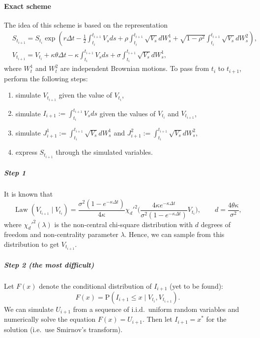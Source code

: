 \documentclass[a4paper,11pt,titlepage]{article}
\renewcommand{\P}{\mathrm{P}}
\DeclareMathOperator{\Law}{Law}
\theoremstyle{remark}
\begin{document}
\paragraph{Exact scheme \citep{BroadieKaya06}} 
The idea of this scheme is based on the representation
\begin{align}
\label{broadie-kaya-1}
&S_{t_{i+1}} = 
  S_{t_i} 
  \exp\left( 
    r\Delta t - \frac12 \int_{t_i}^{t_{i+1}} V_s  ds 
    + \rho\int_{t_i}^{t_{i+1}} \sqrt{V_s} d W_s^1 
    + \sqrt{1-\rho^2} \int_{t_i}^{t_{i+1}} \sqrt{V_s} d W_s^2
  \right),\\
\label{broadie-kaya-2}
&V_{t_{i+1}} = V_{t_i} + \kappa\theta\Delta t 
  - \kappa\int_{t_i}^{t_{i+1}} V_s ds 
  + \sigma \int_{t_i}^{t_{i+1}} \sqrt{V_s} d W_s^1,
\end{align}
where $W^1_t$ and $W_t^2$ are independent Brownian motions. To pass from $t_i$
to $t_{i+1}$, perform the following steps:
\begin{enumerate}
\item simulate $V_{t_{i+1}}$ given the value of $V_{t_i}$,
\item simulate $I_{i+1} := \int_{t_i}^{t_{i+1}} V_s ds$ given the values of
  $V_{t_i}$ and $V_{t_{i+1}}$,
\item simulate $J^1_{i+1} := \int_{t_i}^{t_{i+1}} \sqrt{V_s} d W_s^1$ and 
  $J^2_{i+1} := \int_{t_i}^{t_{i+1}} \sqrt{V_s} d W_s^2$,
\item express $S_{t_{i+1}}$ through the simulated variables.
\end{enumerate}

\subparagraph{Step 1} It is known that
\[
\Law(V_{t_{i+1}} \mid V_{t_i}) = 
  \frac{\sigma^2(1 - e^{-\kappa\Delta t})}{4\kappa}
  \chi_d'^2\biggl(
    \frac{4\kappa e^{-\kappa\Delta t}}
         {\sigma^2(1-e^{-\kappa \Delta t})}V_{t_i}
  \biggr), \qquad 
d = \frac{4\theta\kappa}{\sigma^2},
\]
where $\chi_d'^2(\lambda)$ is the non-central chi-square distribution with $d$
degrees of freedom and non-centrality parameter $\lambda$. Hence, we can sample
from this distribution to get $V_{t_{i+1}}$.

\subparagraph{Step 2 (the most difficult)} Let $F(x)$ denote the conditional
distribution of $I_{i+1}$ (yet to be found):
\[
F(x) = \P(I_{i+1} \le x \mid V_{t_i}, V_{t_{i+1}}).
\]
We can simulate $U_{i+1}$ from a sequence of i.i.d.\ uniform random variables
and numerically solve the equation $F(x) = U_{i+1}$. Then let $I_{i+1} = x^*$
for the solution (i.e.\ use Smirnov's transform).
\end{document}
